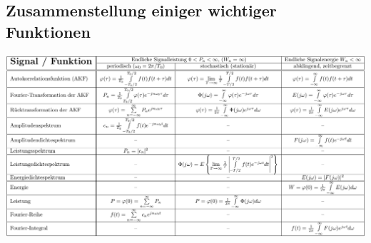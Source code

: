 	\newpage
	\subsection{Zusammenstellung einiger wichtiger Funktionen }

		\begin{center}
			\includegraphics[width=24.5cm,angle=90]{./bilder/zusammenstellung.png}
		\end{center}
	